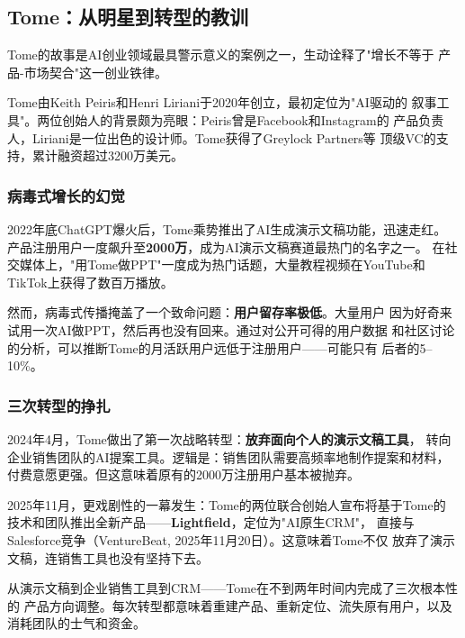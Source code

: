 \subsection{Tome：从明星到转型的教训}
\label{subsec:tome}

Tome的故事是AI创业领域最具警示意义的案例之一，生动诠释了"增长不等于
产品-市场契合"这一创业铁律。

Tome由Keith Peiris和Henri Liriani于2020年创立，最初定位为"AI驱动的
叙事工具"。两位创始人的背景颇为亮眼：Peiris曾是Facebook和Instagram的
产品负责人，Liriani是一位出色的设计师。Tome获得了Greylock Partners等
顶级VC的支持，累计融资超过3200万美元。

\subsubsection{病毒式增长的幻觉}
2022年底ChatGPT爆火后，Tome乘势推出了AI生成演示文稿功能，迅速走红。
产品注册用户一度飙升至\textbf{2000万}，成为AI演示文稿赛道最热门的名字之一。
在社交媒体上，"用Tome做PPT"一度成为热门话题，大量教程视频在YouTube和
TikTok上获得了数百万播放。

然而，病毒式传播掩盖了一个致命问题：\textbf{用户留存率极低}。大量用户
因为好奇来试用一次AI做PPT，然后再也没有回来。通过对公开可得的用户数据
和社区讨论的分析，可以推断Tome的月活跃用户远低于注册用户——可能只有
后者的5--10\%。

\subsubsection{三次转型的挣扎}
2024年4月，Tome做出了第一次战略转型：\textbf{放弃面向个人的演示文稿工具}，
转向企业销售团队的AI提案工具。逻辑是：销售团队需要高频率地制作提案和材料，
付费意愿更强。但这意味着原有的2000万注册用户基本被抛弃。

2025年11月，更戏剧性的一幕发生：Tome的两位联合创始人宣布将基于Tome的
技术和团队推出全新产品——\textbf{Lightfield}，定位为"AI原生CRM"，
直接与Salesforce竞争（VentureBeat, 2025年11月20日）。这意味着Tome不仅
放弃了演示文稿，连销售工具也没有坚持下去。

从演示文稿到企业销售工具到CRM——Tome在不到两年时间内完成了三次根本性的
产品方向调整。每次转型都意味着重建产品、重新定位、流失原有用户，以及
消耗团队的士气和资金。

